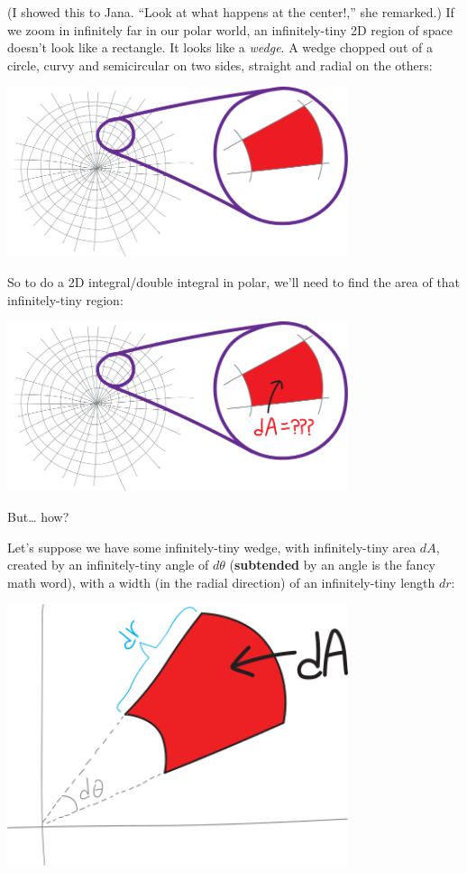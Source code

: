 \documentclass[
]{article}
\begin{document}
(I showed this to Jana. ``Look at what happens at the center!,'' she remarked.) If we zoom in infinitely far in our polar world, an infinitely-tiny 2D region of space doesn't look like a rectangle. It looks like a \emph{wedge}. A wedge chopped out of a circle, curvy and semicircular on two sides, straight and radial on the others:

\includegraphics[width=0.75\textwidth,height=\textheight]{polar-world-2.svg}

So to do a 2D integral/double integral in polar, we'll need to find the area of that infinitely-tiny region:

\includegraphics[width=0.75\textwidth,height=\textheight]{polar-world-3.svg}

But\ldots{} how?

Let's suppose we have some infinitely-tiny wedge, with infinitely-tiny area \(dA\), created by an infinitely-tiny angle of \(d\theta\) (\textbf{subtended} by an angle is the fancy math word), with a width (in the radial direction) of an infinitely-tiny length \(dr\):

\includegraphics[width=0.75\textwidth,height=\textheight]{polar-differential-derivation-1.svg}
\end{document}

